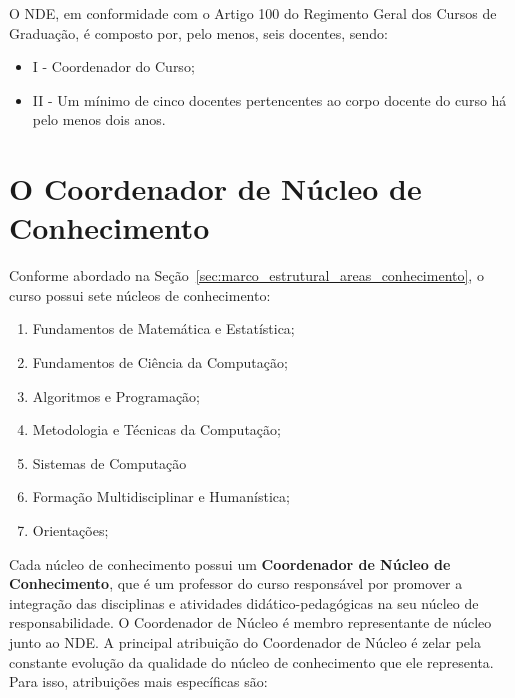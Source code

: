 O NDE, em conformidade com o Artigo 100 do Regimento Geral dos Cursos de Graduação, é composto por, pelo menos, seis docentes, sendo:

\begin{itemize}
\item[] I - Coordenador do Curso;
\item[] II - Um mínimo de cinco docentes pertencentes ao corpo docente do curso há pelo menos dois anos.
\end{itemize}




\section{O Coordenador de Núcleo de Conhecimento}
 

Conforme abordado na Seção~\ref{sec:marco_estrutural_areas_conhecimento}, o curso possui sete núcleos de conhecimento:
\begin{enumerate}
\item Fundamentos de Matemática e Estatística;
\item Fundamentos de Ciência da Computação;
\item Algoritmos e Programação;
\item Metodologia e Técnicas da Computação;
\item Sistemas de Computação
\item Formação Multidisciplinar e Humanística;
\item Orientações;
\end{enumerate}

Cada núcleo de conhecimento possui um \textbf{Coordenador de Núcleo de Conhecimento}, que é um professor do curso responsável por promover a integração das disciplinas e atividades didático-pedagógicas na seu núcleo de responsabilidade. O Coordenador de Núcleo é membro representante de núcleo junto ao NDE. 
A principal atribuição do Coordenador de Núcleo é zelar pela constante evolução da qualidade do núcleo de conhecimento que ele representa. 
Para isso, atribuições mais específicas são:

